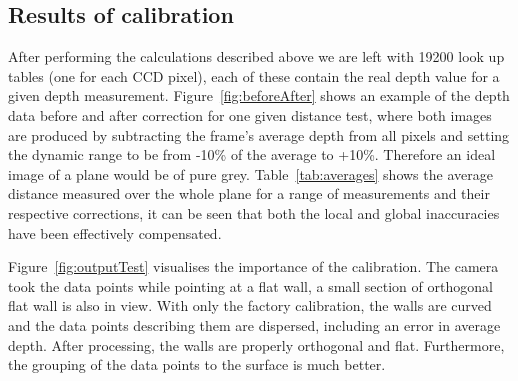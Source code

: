 \documentclass[]{article}
\begin{document}
{\subsection{Results of calibration} %
 \label{sub:results_of_calibration}
 After performing the calculations described above we are left with 19200 look up tables (one for each CCD pixel), each of these contain the real depth value for a given depth measurement. Figure~\ref{fig:beforeAfter} shows an example of the depth data before and after correction for one given distance test, where both images are produced by subtracting the frame's average depth from all pixels and setting the dynamic range to be from -10\% of the average to +10\%. Therefore an ideal image of a plane would be of pure grey. Table~\ref{tab:averages} shows the average distance measured over the whole plane for a range of measurements and their respective corrections, it can be seen that both the local and global inaccuracies have been effectively compensated. 

 Figure~\ref{fig:outputTest} visualises the importance of the calibration. The camera took the data points while pointing at a flat wall, a small section of orthogonal flat wall is also in view. With only the factory calibration, the walls are curved and the data points describing them are dispersed, including an error in average depth. After processing, the walls are properly orthogonal and flat. Furthermore, the grouping of the data points to the surface is much better.


}
\end{document}
